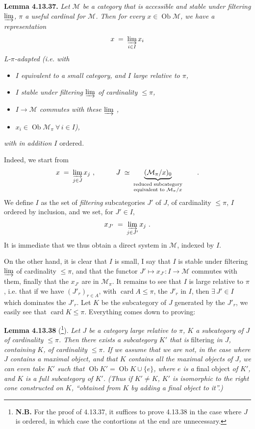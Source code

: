 \documentclass[11pt]{article}
\newcommand{\printedpage}[1]{\marginpar{\footnotesize p.~#1}}
\newcommand{\msp}[1]{\marginpar{\footnotesize [#1]}}
\newcommand{\Ob}{\operatorname{Ob}}
\newcommand{\card}{\operatorname{card}}
\newcommand{\limind}{\varinjlim}
\begin{document}
\textbf{Lemma 4.13.37.} \textit{Let $\mathcal{M}$ be a category}
\msp{page 360}
\textit{that is accessible and stable under filtering $\limind$, $\pi$ a useful cardinal for $\mathcal{M}$. Then for every $x \in \Ob \mathcal{M}$, we have a representation}
\[ x \;=\; \varinjlim_{i\in I} x_i \]
\textit{L-$\pi$-adapted (i.e. with}
\begin{itemize}[leftmargin=2.5em]
\item[\textit{1)}] \textit{$I$ equivalent to a small category, and $I$ large relative to $\pi$,}
\item[\textit{2)}] \textit{$I$ stable under filtering $\limind$ of cardinality $\leqslant \pi$,}
\item[\textit{3)}] \textit{$I \longrightarrow \mathcal{M}$ commutes with these $\limind$ ,}
\item[\textit{d)}] \textit{$x_i \in \Ob \mathcal{M}_\pi \ \forall\, i \in I$),} %
\end{itemize}
\textit{with in addition $I$} ordered.

Indeed, we start from
\[ x \;=\; \varinjlim_{j\in J} x_j \ , \qquad\quad J \;\simeq\; \underbrace{(\mathcal{M}_\pi/x)_0}_{\substack{\text{reduced subcategory}\\ \text{equivalent to } \mathcal{M}_\pi/x}} \qquad . \]
We define $I$ as the set of \textit{filtering} subcategories $J'$ of $J$, of cardinality $\leqslant \pi$, $I$ ordered by inclusion, and we set, for $J' \in I$,
\[ x_{J'} \;=\; \varinjlim_{j\in J'} x_j \ . \]
It is immediate that we thus obtain a direct system in $\mathcal{M}$, indexed by $I$.

\msp{page 361}

On the other hand, it is clear that $I$ is small, I say that $I$ is stable under filtering $\limind$ of cardinality $\leqslant \pi$, and that the functor $J' \longmapsto x_{J'} : I \longrightarrow \mathcal{M}$ commutes with them, finally that the $x_{J'}$ are in $\mathcal{M}_\pi$. It remains to see that $I$ is large relative to $\pi$, i.e. that if we have $(J'_r)_{r\in A}$, with $\card A \leqslant \pi$, the $J'_r$ in $I$, then $\exists\, J' \in I$ which dominates the $J'_r$. Let $K$ be the subcategory of $J$ generated by the $J'_r$, we easily see that $\card K \leqslant \pi$. Everything comes down to proving:

\printedpage{137}
\textbf{Lemma 4.13.38} (\footnote[160]{\textbf{N.B.} For the proof of 4.13.37, it suffices to prove 4.13.38 in the case where $J$ is ordered, in which case the contortions at the end are unnecessary.}). \textit{Let $J$ be a category large relative to $\pi$, $K$ a subcategory of $J$ of cardinality $\leqslant \pi$. Then there exists a subcategory $K'$ that is} filtering \textit{in $J$, containing $K$, of cardinality $\leqslant \pi$. If we assume that we are not, in the case where $J$ contains a maximal object, and that $K$ contains all the maximal objects of $J$,}
\msp{page 362}
\textit{we can even take $K'$ such that $\Ob K' = \Ob K \cup \{e\}$, where $e$ is a} final object \textit{of $K'$, and $K$ is a full subcategory of $K'$. (Thus if $K' \neq K$, $K'$ is isomorphic to the right cone constructed on $K$, ``obtained from $K$ by adding a final object to it''.)}
\end{document}
